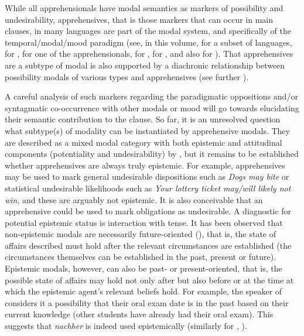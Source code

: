 \documentclass[output=paper,colorlinks,citecolor=brown]{langscibook}
\begin{document}
While all apprehensionals have modal semantics as markers of possibility and undesirability, apprehensives, that is those markers that can occur in main clauses, in many languages are part of the modal system, and specifically of the temporal/modal/mood paradigm (see, in this volume, \citeauthor{chapters/browne} for a subset of  languages, \citeauthor{chapters/fedotov} for ,  \citeauthor{chapters/francez} for one of the  apprehensionals, \citeauthor{chapters/francois} for , \citeauthor{chapters/treis} for , and also \citealt{vuillermet2012} \citeyear{vuillermet2018a} for ). That apprehensives are a subtype of modal is also supported by a diachronic relationship between possibility modals of various types and apprehensives (see further ).

A careful analysis of such markers regarding the paradigmatic oppositions and/or syntagmatic co-occurrence with other modals or mood will go towards elucidating their semantic contribution to the clause. So far, it is an unresolved question what subtype(s) of modality can be instantiated by apprehensive modals. They are described as a mixed modal category with both epistemic and attitudinal components (potentiality and undesirability) by \citet[293]{lichtenberk1995}, but it remains to be established whether apprehensives are always truly epistemic. For example, apprehensives may be used to mark general undesirable dispositions such as \textit{Dogs may bite} or statistical undesirable likelihoods such as \textit{Your lottery ticket may/will likely not win}, and these are arguably not epistemic. It is also conceivable that an apprehensive could be used to mark obligations as undesirable. A diagnostic for potential epistemic status is interaction with tense. It has been observed that non-epistemic modals are necessarily future-oriented (\cite{condoravdi2002,rullmannmatthewson2018}), that is, the state of affairs described must hold after the relevant circumstances are established (the circumstances themselves can be established in the past, present or future). Epistemic modals, however, can also be past- or present-oriented, that is, the possible state of affairs may hold not only after but also before or at the time at which the epistemic agent's relevant beliefs hold. For example, the speaker of  considers it a possibility that their oral exam date is in the past based on their current knowledge (other students have already had their oral exam). This suggests that  \textit{nachher} is indeed used epistemically (similarly for , \citealt{chapters/francez}).
\end{document}
